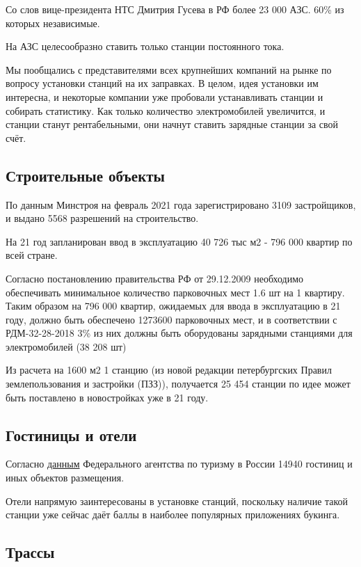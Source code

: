 \documentclass[a4paper,12pt]{report}
\begin{document}
Со слов вице-президента НТС Дмитрия Гусева в РФ более 23 000 АЗС. 60\% из которых независимые. 

На АЗС целесообразно ставить только станции постоянного тока.

Мы пообщались с представителями всех крупнейших компаний на рынке по вопросу установки станций на их заправках. В целом, идея установки им интересна, и некоторые компании уже пробовали устанавливать станции и собирать статистику. Как только количество электромобилей увеличится, и станции станут рентабельными, они начнут ставить зарядные станции за свой счёт. 

\subsection{Строительные объекты}

По данным Минстроя на февраль 2021 года зарегистрировано 3109 застройщиков, и выдано 5568 разрешений на строительство.

На 21 год запланирован ввод в эксплуатацию 40 726 тыс м2 - 796 000 квартир по всей стране. 

Согласно постановлению правительства РФ от 29.12.2009 необходимо обеспечивать минимальное количество парковочных мест 1.6 шт на 1 квартиру. Таким образом на 796 000 квартир, ожидаемых для ввода в эксплуатацию в 21 году, должно быть обеспечено 1273600 парковочных мест, и в соответствии с РДМ-32-28-2018 3\% из них должны быть оборудованы зарядными станциями для электромобилей (38 208 шт)

Из расчета на 1600 м2 1 станцию (из новой редакции петербургских Правил землепользования и застройки (ПЗЗ)), получается 25 454 станции по идее может быть поставлено в новостройках уже в 21 году.

\subsection{Гостиницы и отели}

Согласно \href{https://классификация-туризм.рф/displayAccommodation/index}{данным} Федерального агентства по туризму в России 14940 гостиниц и иных объектов размещения. 

Отели напрямую заинтересованы в установке станций, поскольку наличие такой станции уже сейчас даёт баллы в наиболее популярных приложениях букинга. 

\subsection{Трассы}
\end{document}
